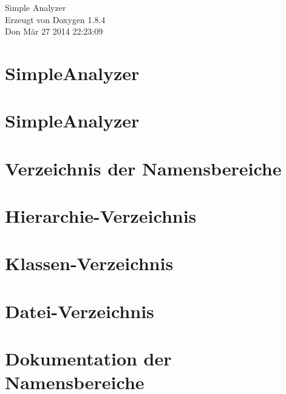 \documentclass[twoside]{book}
\newcommand{\clearemptydoublepage}{%
  \newpage{\pagestyle{empty}\cleardoublepage}%
}
\begin{document}
\hypersetup{pageanchor=false}
\begin{titlepage}
\vspace*{7cm}
\begin{center}%
{\Large Simple Analyzer }\\
\vspace*{1cm}
{\large Erzeugt von Doxygen 1.8.4}\\
\vspace*{0.5cm}
{\small Don Mär 27 2014 22:23:09}\\
\end{center}
\end{titlepage}
\clearemptydoublepage
\tableofcontents
\clearemptydoublepage
{}
\hypersetup{pageanchor=true}

\chapter{Simple\-Analyzer}
\label{index}\hypertarget{index}{}
\chapter{Simple\-Analyzer}
\label{md__daten_Projekte_eclipse_workspace_README}
\hypertarget{md__daten_Projekte_eclipse_workspace_README}{}

\chapter{Verzeichnis der Namensbereiche}

\chapter{Hierarchie-\/\-Verzeichnis}

\chapter{Klassen-\/\-Verzeichnis}

\chapter{Datei-\/\-Verzeichnis}

\chapter{Dokumentation der Namensbereiche}


\end{document}
